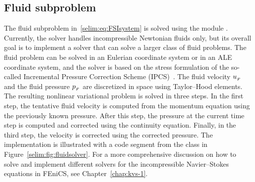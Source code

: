 \subsection{Fluid subproblem}

The fluid subproblem in~\eqref{selim:eq:FSIsystem} is solved using the
 module . Currently, the solver
handles incompressible Newtonian fluids only, but its overall goal is
to implement a solver that can solve a larger class of fluid problems.
The fluid problem can be solved in an Eulerian coordinate system or in
an ALE coordinate system, and the solver is based on the stress
formulation of the so-called Incremental Pressure Correction Scheme
(IPCS)~\citep{Goda1979}. The fluid velocity $u_{_{F}}$ and the fluid
pressure $p_{_{F}}$ are discretized in space using Taylor--Hood
elements. The resulting nonlinear variational problem is solved in
three steps. In the first step, the tentative fluid velocity is
computed from the momentum equation using the previously known
pressure. After this step, the pressure at the current time step is
computed and corrected using the continuity equation. Finally, in the
third step, the velocity is corrected using the corrected pressure.
The implementation is illustrated with a code segment from the class
 in Figure~\ref{selim:fig:fluidsolver}. For
a more comprehensive discussion on how to solve and implement different
solvers for the incompressible Navier--Stokes equations in FEniCS,
see Chapter~\ref{chap:kvs-1}.

